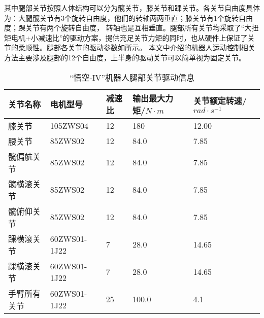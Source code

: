 其中腿部关节按照人体结构可以分为髋关节，膝关节和踝关节。各关节自由度具体为：大腿髋关节有3个旋转自由度，他们的转轴两两垂直；膝关节有1个旋转自由度；踝关节有两个旋转自由度，
转轴也是互相垂直。腿部所有关节均采取了“大扭矩电机+小减速比”的驱动方案，提供充足关节力矩的同时，也从硬件上保证了关节的柔顺性。腿部各关节的驱动参数如所示。
本文中介绍的机器人运动控制相关方法主要涉及腿部的12个自由度，上半身的驱动关节可以简单视为固定关节。
\begin{table}[htbp]
	\centering
	\caption{“悟空-IV”机器人腿部关节驱动信息}
	\label{joint_motor}
	\begin{tabular}{m{3cm}<{\centering}m{3cm}<{\centering}m{1.5cm}<{\centering}m{2cm}<{\centering}m{2.5cm}<{\centering}}
		\toprule  %
		关节名称   &电机型号  &减速比  &输出最大力矩/$N \cdot m$ &关节额定转速/$rad\cdot s^{-1}$ \\
		\midrule  %
		膝关节 & 105ZWS04 & 12 & 180 & 12.00\\
		腰关节 & 85ZWS02 & 12 & 84.0 & 7.85\\        
		髋偏航关节 & 85ZWS02 & 12 & 84.0 & 7.85\\
		髋横滚关节 & 85ZWS02 & 12 & 84.0 & 7.85\\
		髋俯仰关节 & 85ZWS02 & 12 & 84.0 & 7.85\\
        踝横滚关节 & 60ZWS01-1J22 & 7 & 28.0 & 14.65\\
        踝横滚关节 & 60ZWS01-1J22 & 7 & 28.0 & 14.65\\
        手臂所有关节 & 60ZWS01-1J22 & 25 & 100.0 & 4.1\\
		\bottomrule %
	\end{tabular}
\end{table}
